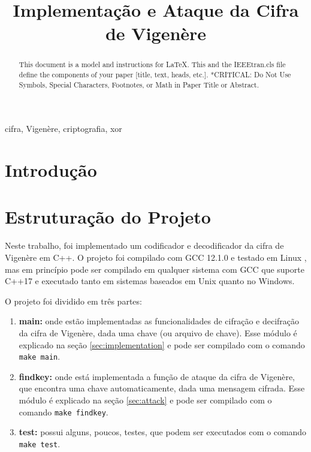 \documentclass[conference]{IEEEtran}
\begin{document}
\title{Implementação e Ataque da Cifra de Vigenère}

\author{
}

\maketitle

\begin{abstract}
    \cite{englishfrequency}
This document is a model and instructions for \LaTeX.
This and the IEEEtran.cls file define the components of your paper [title, text, heads, etc.]. *CRITICAL: Do Not Use Symbols, Special Characters, Footnotes, 
or Math in Paper Title or Abstract.
\end{abstract}

\begin{IEEEkeywords}
    cifra, Vigenère, criptografia, xor
\end{IEEEkeywords}

\section{Introdução} %


\section{Estruturação do Projeto} %
Neste trabalho, foi implementado um codificador e decodificador da cifra de
Vigenère em C++. O projeto foi compilado com GCC 12.1.0 e testado em Linux , mas
em princípio pode ser compilado em qualquer sistema com GCC que suporte C++17 e
executado tanto em sistemas baseados em Unix quanto no Windows. 

O projeto foi dividido em três partes:

\begin{enumerate}
    \item \textbf{main:} onde estão implementadas as funcionalidades de cifração
        e decifração da cifra de Vigenère, dada uma chave (ou arquivo de chave).
        Esse módulo é explicado na seção \ref{sec:implementation} e pode ser
        compilado com o comando \verb|make main|.
    \item \textbf{findkey:} onde está implementada a função de ataque da
        cifra de Vigenère, que encontra uma chave automaticamente, dada uma
        mensagem cifrada. Esse módulo é explicado na seção \ref{sec:attack} e
        pode ser compilado com o comando \verb|make findkey|. 
    \item \textbf{test:} possui alguns, poucos, testes, que podem ser executados
        com o comando \verb|make test|.
\end{enumerate}
\end{document}
